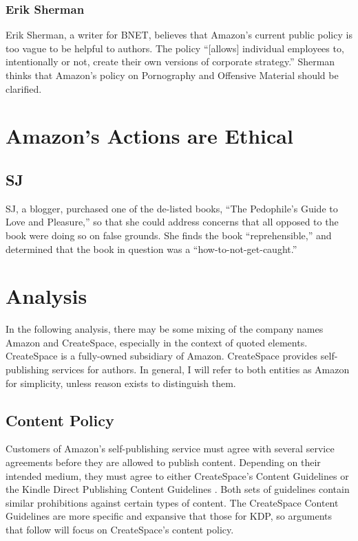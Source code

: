 \documentclass[11pt]{article}
\begin{document}
\begin{multicols}{2}
\subsubsection{Erik Sherman}

Erik Sherman, a writer for BNET, believes that Amazon's current public policy is too vague to be helpful to authors.  The policy  ``[allows] individual employees to, intentionally or not, create their own versions of corporate strategy.'' \cite{ShermanAmazonExecs} Sherman thinks that Amazon's policy on Pornography and Offensive Material should be clarified.

\section{Amazon's Actions are Ethical}

\subsection{SJ}

SJ, a blogger, purchased one of the de-listed books, ``The Pedophile's Guide to Love and Pleasure,'' so that she could address concerns that all opposed to the book were doing so on false grounds.  She finds the book ``reprehensible,'' and determined that the book in question was a ``how-to-not-get-caught.'' \cite{iasshole}

\section{Analysis}

In the following analysis, there may be some mixing of the company names Amazon and CreateSpace, especially in the context of quoted elements.  CreateSpace is a fully-owned subsidiary of Amazon.  CreateSpace provides self-publishing services for authors.  In general, I will refer to both entities as Amazon for simplicity, unless reason exists to distinguish them.

\subsection{Content Policy}

Customers of Amazon's self-publishing service must agree with several service agreements before they are allowed to publish content.  Depending on their intended medium, they must agree to either CreateSpace's Content Guidelines \cite{CreateSpaceContentGuidelines} or the Kindle Direct Publishing Content Guidelines \cite{AmazonKDPContentGuidelines}.  Both sets of guidelines contain similar prohibitions against certain types of content.  The CreateSpace Content Guidelines are more specific and expansive that those for KDP, so arguments that follow will focus on CreateSpace's content policy.


\end{multicols}
\end{document}
